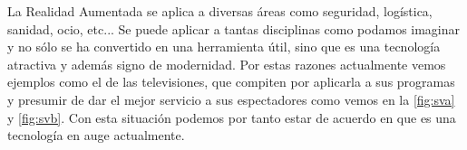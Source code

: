 \begin{figure}[htb]
    \centering
\end{figure}


La Realidad Aumentada se aplica a diversas áreas como seguridad, logística, sanidad, ocio, etc...
 Se puede aplicar a tantas disciplinas como podamos imaginar y no sólo se ha convertido en una herramienta útil, sino que es una tecnología atractiva
 y además signo de modernidad. Por estas razones actualmente vemos ejemplos como el de las televisiones, que compiten por aplicarla a sus programas
 y presumir de dar el mejor servicio a sus espectadores como vemos en la \autoref{fig:sva} y \autoref{fig:svb}. Con esta situación podemos por tanto estar de acuerdo
 en que es una tecnología en auge actualmente. 


